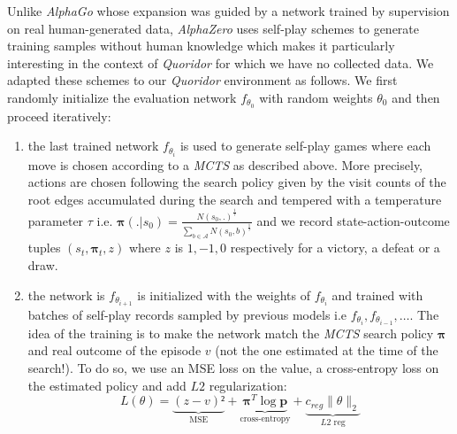 \documentclass[journal, a4paper]{IEEEtran}
\begin{document}
    Unlike \textit{AlphaGo}\cite{alphago} whose expansion was guided by a network trained by supervision on real human-generated data, \textit{AlphaZero} uses self-play schemes to generate training samples without human knowledge which makes it particularly interesting in the context of \textit{Quoridor} for which we have no collected data. We adapted these schemes to our \textit{Quoridor} environment as follows. We first randomly initialize the evaluation network $f_{\theta_0}$ with random weights $\theta_0$ and then proceed iteratively:
    \begin{enumerate}
        \item the last trained network $f_{\theta_i}$ is used to generate self-play games where each move is chosen according to a \textit{MCTS} as described above. More precisely, actions are chosen following the search policy given by the visit counts of the root edges accumulated during the search and tempered with a temperature parameter $\tau$ i.e. $\boldsymbol{\pi}(.|s_0)=\frac{N(s_0,.)^\frac{1}{\tau}}{\sum_{b\in\mathcal{A}}N(s_0, b)^\frac{1}{\tau}}$ and we record state-action-outcome tuples $(s_t, \boldsymbol{\pi}_t, z)$ where $z$ is $1, -1, 0$ respectively for a victory, a defeat or a draw.
        \item the network is $f_{\theta_{i+1}}$ is initialized with the weights of $f_{\theta_i}$ and trained with batches of self-play records sampled by previous models i.e $f_{\theta_i}, f_{\theta_{i-1}}, \ldots$. The idea of the training is to make the network match the \textit{MCTS} search policy $\boldsymbol{\pi}$ and real outcome of the episode $v$ (not the one estimated at the time of the search!). To do so, we use an MSE loss on the value, a cross-entropy loss on the estimated policy and add $L2$ regularization:
        \begin{equation}
            L(\theta) = \underbrace{(z-v)²}_\text{MSE}+\underbrace{\boldsymbol{\pi}^T\log\mathbf{p}}_\text{cross-entropy}+\underbrace{c_{reg}\lVert\theta\rVert_2}_{L2\text{ reg}}
        \end{equation}
    \end{enumerate} 
\end{document}
